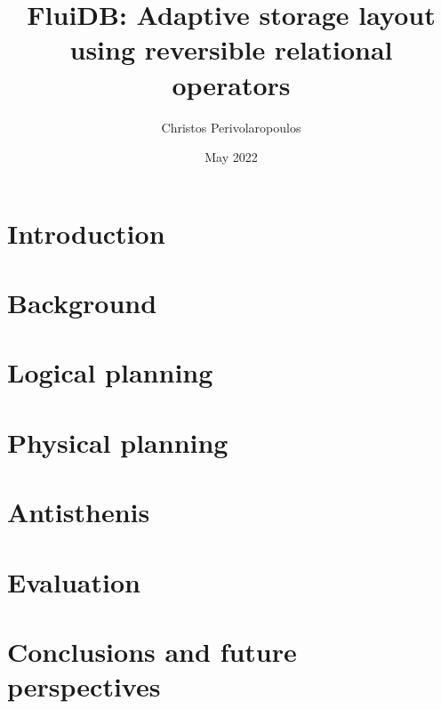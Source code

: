 \documentclass{beamer}
\title{FluiDB: Adaptive storage layout using reversible relational operators}
\author{Christos Perivolaropoulos}
\institute{University of Edinburgh}
\date{May 2022}
\begin{document}
\begin{frame}
\titlepage
\end{frame}

\section{Introduction}
\label{section:introduction}


\section{Background}
\label{section:background}


\section{Logical planning}
\label{section:fluidb_logical_planning}


\section{Physical planning}
\label{section:physical_planning}


\section{Antisthenis}
\label{section:antisthenis}


% 

\section{Evaluation}
\label{section:evaluation}


\section{Conclusions and future perspectives}
\label{section:conclusion}

\end{document}
